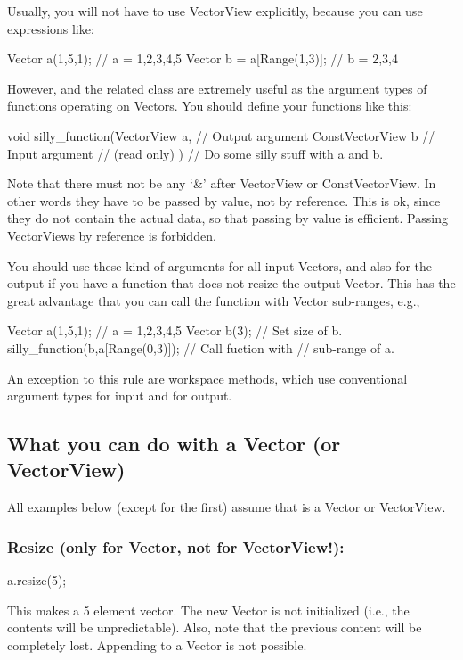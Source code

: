 Usually, you will not have to use VectorView explicitly, because you
can use expressions like:

\begin{code}
Vector a(1,5,1);                // a = 1,2,3,4,5
Vector b = a[Range(1,3)];       // b = 2,3,4
\end{code}

However,  and the related class
 are extremely useful as the argument types of
functions operating on Vectors. You should define your functions like
this:

\begin{code}
void silly_function(VectorView a,      // Output argument
                    ConstVectorView b  // Input argument
                                       // (read only)
                   )
{
   // Do some silly stuff with a and b.
}
\end{code}

Note that there must not be any `\&' after VectorView or
ConstVectorView. In other words they have to be passed by value, not
by reference. This is ok, since they do not contain the actual
data, so that passing by value is efficient. Passing VectorViews by
reference is forbidden.

You should use these kind of arguments for all input Vectors, and also
for the output if you have a function that does not resize the output
Vector. This has the great advantage that you can call the function
with Vector sub-ranges, e.g., 
\begin{code}
Vector a(1,5,1);                  // a = 1,2,3,4,5
Vector b(3);                      // Set size of b.
silly_function(b,a[Range(0,3)]);  // Call fuction with
                                  // sub-range of a.
\end{code}

An exception to this rule are workspace methods, which use
conventional argument types  for input and
 for output.

\subsection{What you can do with a Vector (or VectorView)}

All examples below (except for the first) assume that  is a
Vector or VectorView.

\subsubsection{Resize (only for Vector, not for VectorView!):}
\begin{code}
a.resize(5);
\end{code}
This makes  a 5 element vector. The new Vector is not
initialized (i.e., the contents will be unpredictable). Also, note
that the previous content will be completely lost. Appending to a
Vector is not possible.

